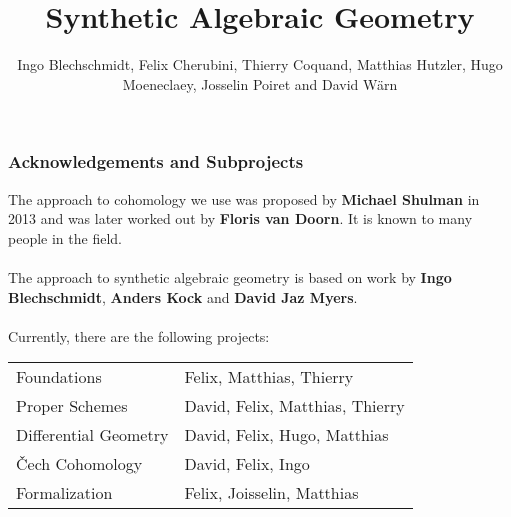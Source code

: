 \documentclass{beamer}
\title[ConCoh]
{Synthetic Algebraic Geometry}
\author[Author, Anders] 
{Ingo Blechschmidt, Felix Cherubini, Thierry Coquand, Matthias Hutzler, Hugo Moeneclaey, Josselin Poiret and David Wärn}
\begin{document}
\date{}
\begin{frame}
  \titlepage
\end{frame}

\begin{frame}
  \frametitle{Acknowledgements and Subprojects}
  The approach to cohomology we use was proposed by \textbf{Michael Shulman} in 2013 and was later worked out by \textbf{Floris van Doorn}.
  It is known to many people in the field. \\ ~\\
  \pause
  The approach to synthetic algebraic geometry is based on work by  \textbf{Ingo Blechschmidt}, \textbf{Anders Kock} and \textbf{David Jaz Myers}. \\  ~\\
  \pause
  Currently, there are the following projects:
  \begin{table}
    \centering
    \begin{tabular}{lp{7.5cm}}
      Foundations & Felix, Matthias, Thierry \\
      Proper Schemes & David, Felix, Matthias, Thierry \\
      Differential Geometry & David, Felix, Hugo, Matthias \\
      \v{C}ech Cohomology & David, Felix, Ingo \\
      Formalization & Felix, Joisselin, Matthias \\
    \end{tabular}
  \end{table}
  
\end{frame}
\end{document}
